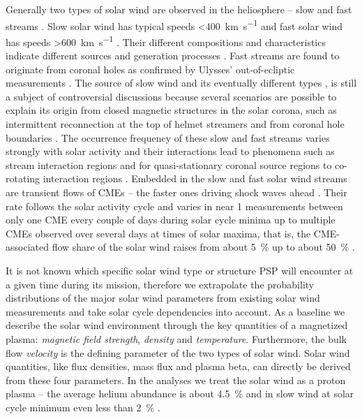 Generally two types of solar wind are observed in the heliosphere -- slow and fast streams \citep{Neugebauer1966,Schwenn1983}. Slow solar wind has typical speeds \SI{<400}{\km\per\s} and fast solar wind has speeds \SI{>600}{\km\per\s} \citep[p.~144]{Schwenn1990}. Their different compositions and characteristics indicate different sources and generation processes \citep{McGregor2011a}. Fast streams are found to originate from coronal holes as confirmed by Ulysses' out-of-ecliptic measurements \citep{McComas1998}. The source of slow wind and its eventually different types \citep{Schwenn1983}, is still a subject of controversial discussions because several scenarios are possible to explain its origin from closed magnetic structures in the solar corona, such as intermittent reconnection at the top of helmet streamers and from coronal hole boundaries \citep{Kilpua2016}. The occurrence frequency of these slow and fast streams varies strongly with solar activity and their interactions lead to phenomena such as stream interaction regions and for quasi-stationary coronal source regions to co-rotating interaction regions \citep{Balogh1999}.
Embedded in the slow and fast solar wind streams are transient flows of CMEs -- the faster ones driving shock waves ahead \citep{Gosling1974}. Their rate follows the solar activity cycle and varies in near \SI{1}{\au} measurements between only one CME every couple of days during solar cycle minima up to multiple CMEs observed over several days at times of solar maxima, that is, the CME-associated flow share of the solar wind raises from about \SI{5}{\percent} up to about \SI{50}{\percent} \citep{Richardson2012}.

It is not known which specific solar wind type or structure PSP will encounter at a given time during its mission, therefore we extrapolate the probability distributions of the major solar wind parameters from existing solar wind measurements and take solar cycle dependencies into account.
As a baseline we describe the solar wind environment through the key quantities of a magnetized plasma: \emph{magnetic field strength}, \emph{density} and \emph{temperature}. Furthermore, the bulk flow \emph{velocity} is the defining parameter of the two types of solar wind. Solar wind quantities, like flux densities, mass flux and plasma beta, can directly be derived from these four parameters. In the analyses we treat the solar wind as a proton plasma -- the average helium abundance is about \SI{4.5}{\percent} and in slow wind at solar cycle minimum even less than \SI{2}{\percent} \citep{Feldman1978,Schwenn1983,Kasper2012}.

